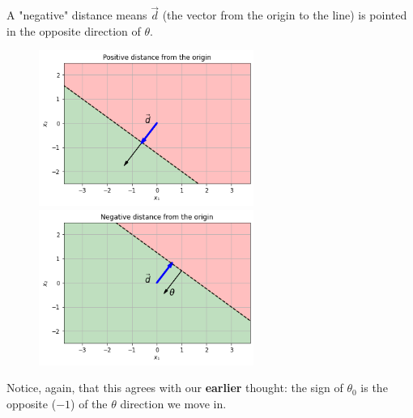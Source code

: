         A "negative" distance means $\vec{d}$ (the vector from the origin to the line) is pointed in the opposite direction of $\theta$.
        
        \begin{figure}[H]
            \includegraphics[width=70mm,scale=0.5]{images/classification_images/positive_distance.png}
            \includegraphics[width=70mm,scale=0.5]{images/classification_images/negative_distance.png}
            
        \end{figure}
        
        Notice, again, that this agrees with our \textbf{earlier} thought: the sign of $\theta_0$ is the opposite ($-1$) of the $\theta$ direction we move in.